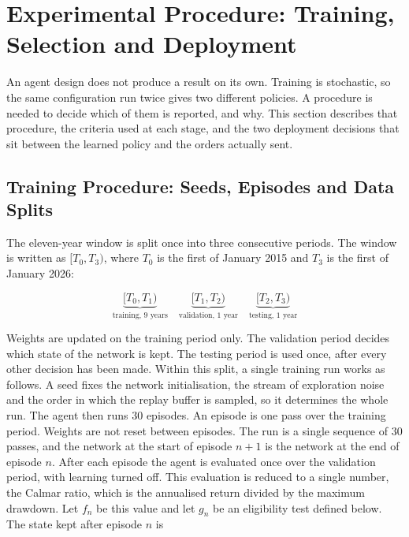 \section{Experimental Procedure: Training, Selection and Deployment}
\label{Section:ExperimentalProcedure}

An agent design does not produce a result on its own. Training is stochastic, so the same configuration run twice gives two different policies. A procedure is needed to decide which of them is reported, and why. This section describes that procedure, the criteria used at each stage, and the two deployment decisions that sit between the learned policy and the orders actually sent.

\subsection{Training Procedure: Seeds, Episodes and Data Splits}

The eleven-year window is split once into three consecutive periods. The window is written as $[T_0, T_3)$, where $T_0$ is the first of January 2015 and $T_3$ is the first of January 2026:

\begin{equation}
\underbrace{[T_0, T_1)}_{\text{training, 9 years}} \quad
\underbrace{[T_1, T_2)}_{\text{validation, 1 year}} \quad
\underbrace{[T_2, T_3)}_{\text{testing, 1 year}}
\label{Equation:Split}
\end{equation}

Weights are updated on the training period only. The validation period decides which state of the network is kept. The testing period is used once, after every other decision has been made. Within this split, a single training run works as follows. A seed fixes the network initialisation, the stream of exploration noise and the order in which the replay buffer is sampled, so it determines the whole run. The agent then runs $30$ episodes. An episode is one pass over the training period. Weights are not reset between episodes. The run is a single sequence of $30$ passes, and the network at the start of episode $n+1$ is the network at the end of episode $n$. After each episode the agent is evaluated once over the validation period, with learning turned off. This evaluation is reduced to a single number, the Calmar ratio, which is the annualised return divided by the maximum drawdown. Let $f_n$ be this value and let $g_n$ be an eligibility test defined below. The state kept after episode $n$ is

